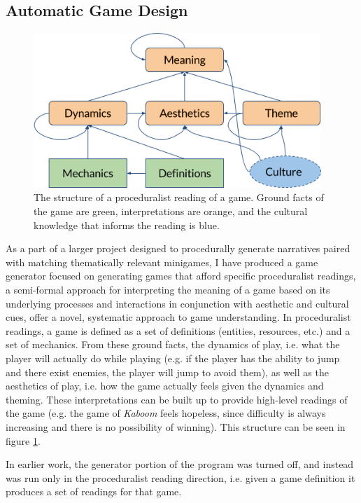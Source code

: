 \documentclass[a4paper]{article}
\begin{document}
\subsection{Automatic Game Design}

\begin{figure}[ht]
\centering
    \includegraphics[width=0.97\textwidth]{figures/Proceduralist_Readings_Graph.png}
    \caption{The structure of a proceduralist reading of a game.  Ground facts of the game are green, interpretations are orange, and the cultural knowledge that informs the reading is blue.}
  \label{fig:proc_read}
\end{figure}
  As a part of a larger project designed to procedurally generate narratives paired with matching thematically relevant minigames, I have produced a game generator focused on generating games that afford specific proceduralist readings, a semi-formal approach for interpreting the meaning of a game based on its underlying processes and interactions in conjunction with aesthetic and cultural cues, offer a novel, systematic approach to game understanding.  In proceduralist readings, a game is defined as a set of definitions (entities, resources, etc.) and a set of mechanics.  From these ground facts, the dynamics of play, i.e. what the player will actually do while playing (e.g. if the player has the ability to jump and there exist enemies, the player will jump to avoid them), as well as the aesthetics of play, i.e. how the game actually feels given the dynamics and theming.  These interpretations can be built up to provide high-level readings of the game (e.g. the game of \textit{Kaboom} feels hopeless, since difficulty is always increasing and there is no possibility of winning).  This structure can be seen in figure \ref{fig:proc_read}.
  
In earlier work, the generator portion of the program was turned off, and instead was run only in the proceduralist reading direction, i.e. given a game definition it produces a set of readings for that game.
  
\end{document}
